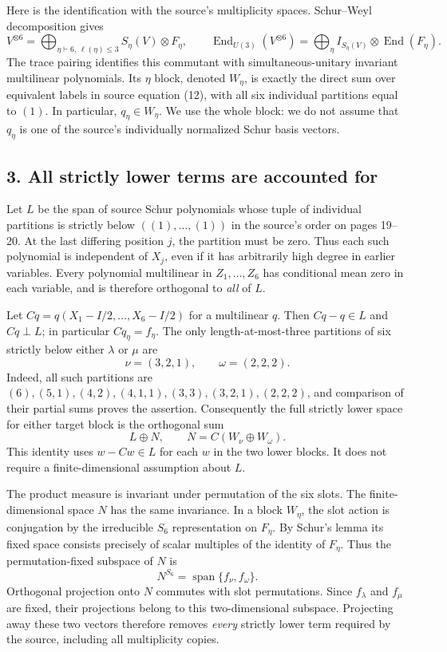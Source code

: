 \documentclass[11pt]{article}
\newcommand{\End}{\operatorname{End}}
\begin{document}
Here is the identification with the source's multiplicity spaces.
Schur--Weyl decomposition gives
\[
 V^{\otimes6}=\bigoplus_{\eta\vdash6,\,\ell(\eta)\le3}
              S_\eta(V)\otimes F_\eta,
 \qquad
 \End_{U(3)}(V^{\otimes6})=
              \bigoplus_\eta I_{S_\eta(V)}\otimes\End(F_\eta).
\]
The trace pairing identifies this commutant with simultaneous-unitary
invariant multilinear polynomials. Its $\eta$ block, denoted $W_\eta$,
is exactly the direct sum over equivalent labels in source equation
(12), with all six individual partitions equal to $(1)$.
In particular, $q_\eta\in W_\eta$.
We use the whole block: we do not assume that $q_\eta$ is one of the
source's individually normalized Schur basis vectors.

\subsection*{3. All strictly lower terms are accounted for}
Let $L$ be the span of source Schur polynomials whose tuple of
individual partitions is strictly below $((1),\ldots,(1))$ in the
source's order on pages 19--20. At the last differing position $j$,
the partition must be zero. Thus each such polynomial is independent
of $X_j$, even if it has arbitrarily high degree in earlier variables.
Every polynomial multilinear in $Z_1,\ldots,Z_6$ has conditional mean
zero in each variable, and is therefore orthogonal to \emph{all} of $L$.

Let $Cq=q(X_1-I/2,\ldots,X_6-I/2)$ for a multilinear $q$.
Then $Cq-q\in L$ and $Cq\perp L$; in particular $Cq_\eta=f_\eta$.
The only length-at-most-three partitions of six strictly below either
$\lambda$ or $\mu$ are
\[
 \nu=(3,2,1),\qquad \omega=(2,2,2).
\]
Indeed, all such partitions are
$(6),(5,1),(4,2),(4,1,1),(3,3),(3,2,1),(2,2,2)$, and comparison of
their partial sums proves the assertion. Consequently the full
strictly lower space for either target block is the orthogonal sum
\begin{equation}\label{lower}
 L\mathbin{\oplus}N,\qquad N=C(W_\nu\oplus W_\omega).
\end{equation}
This identity uses $w-Cw\in L$ for each $w$ in the two lower blocks.
It does not require a finite-dimensional assumption about $L$.

The product measure is invariant under permutation of the six slots.
The finite-dimensional space $N$ has the same invariance.
In a block $W_\eta$, the slot action is conjugation by the irreducible
$S_6$ representation on $F_\eta$. By Schur's lemma its fixed space
consists precisely of scalar multiples of the identity of $F_\eta$.
Thus the permutation-fixed subspace of $N$ is
\[
 N^{S_6}=\operatorname{span}\{f_\nu,f_\omega\}.
\]
Orthogonal projection onto $N$ commutes with slot permutations.
Since $f_\lambda$ and $f_\mu$ are fixed, their projections belong to
this two-dimensional subspace. Projecting away these two vectors
therefore removes \emph{every} strictly lower term required by the
source, including all multiplicity copies.
\end{document}

